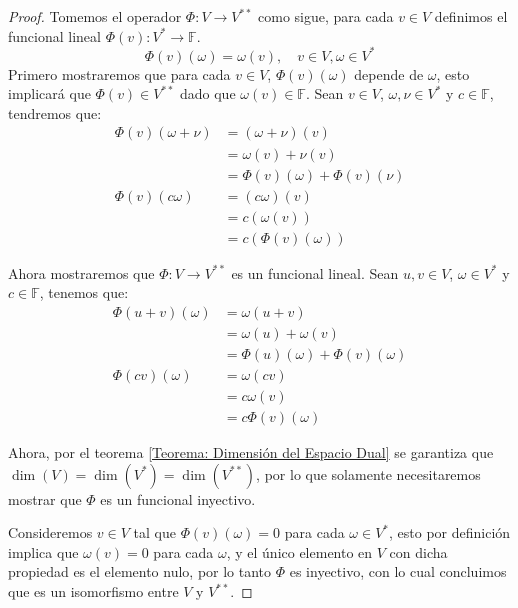 \begin{proof}
	Tomemos el operador $\Phi: V \to V^{**}$ como sigue, para cada $v \in V$ definimos el funcional lineal $\Phi(v): V^{*} \to \mathbb{F}$.
	\[
		\Phi(v)(\omega) = \omega(v), \quad v \in V, \omega \in V^{*}
	\]
	Primero mostraremos que para cada $v \in V$, $\Phi(v)(\omega)$ depende de $\omega$, esto implicará que $\Phi(v) \in V^{**}$ dado que $\omega(v) \in \mathbb{F}$. Sean $v \in V$, $\omega,\nu \in V^{*}$ y $c \in \mathbb{F}$, tendremos que:
	\begin{align*}
		\Phi(v)(\omega + \nu) & = (\omega + \nu)(v)              \\
		                      & = \omega(v) + \nu(v)             \\
		                      & = \Phi(v)(\omega) + \Phi(v)(\nu) \\
		\Phi(v)(c \omega)     & = (c\omega)(v)                   \\
		                      & = c(\omega(v))                   \\
		                      & = c(\Phi(v)(\omega))
	\end{align*}

	Ahora mostraremos que $\Phi: V \to V^{**}$ es un funcional lineal. Sean $u,v \in V$, $\omega \in V^{*}$ y $c \in \mathbb{F}$, tenemos que:
	\begin{align*}
		\Phi(u + v)(\omega) & = \omega(u + v)                     \\
		                    & = \omega(u) + \omega(v)             \\
		                    & = \Phi(u)(\omega) + \Phi(v)(\omega) \\
		\Phi(c v)(\omega)   & = \omega(cv)                        \\
		                    & = c\omega(v)                        \\
		                    & = c \Phi(v)(\omega)
	\end{align*}

	Ahora, por el teorema \ref{Teorema: Dimensión del Espacio Dual} se garantiza que $\dim(V) = \dim(V^{*}) = \dim(V^{**})$, por lo que solamente necesitaremos mostrar que $\Phi$ es un funcional inyectivo.

	Consideremos $v \in V$ tal que $\Phi(v)(\omega) = 0$ para cada $\omega \in V^{*}$, esto por definición implica que $\omega(v) = 0$ para cada $\omega$, y el único elemento en $V$ con dicha propiedad es el elemento nulo, por lo tanto $\Phi$ es inyectivo, con lo cual concluimos que es un isomorfismo entre $V$ y $V^{**}$.
\end{proof}
